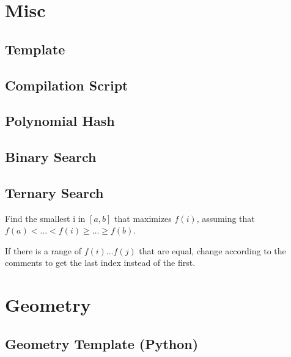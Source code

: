 \documentclass{article}
\begin{document}
\section*{Misc}

\subsection*{Template}


\subsection*{Compilation Script}


\subsection*{Polynomial Hash}


\subsection*{Binary Search}


\subsection*{Ternary Search}
Find the smallest i in $[a,b]$ that maximizes $f(i)$, assuming that $f(a) < \dots < f(i) \ge \dots \ge f(b)$.

If there is a range of $f(i) \dots f(j)$ that are equal, change according to the comments to get the last index instead of the first.

\begin{multicols}{2}
  
  \columnbreak
  
\end{multicols}

\section*{Geometry}

\subsection*{Geometry Template (Python)}

\end{document}
